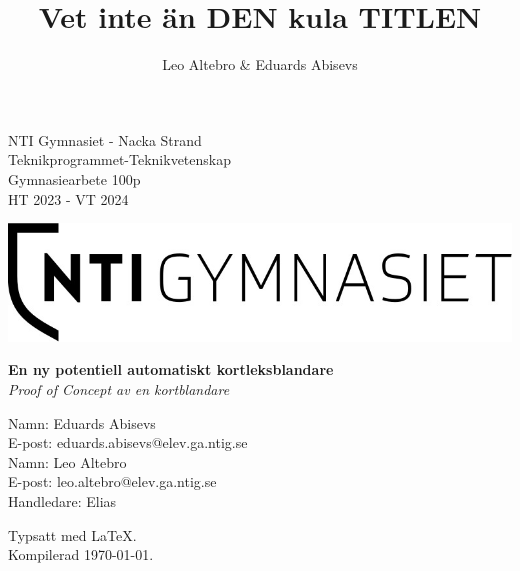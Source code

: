 \documentclass[swedish,a4paper]{article}
\title{Vet inte än DEN kula TITLEN}
\author{Leo Altebro & Eduards Abisevs}
\begin{document}
\begin{titlepage}
\begin{minipage}[t]{0.45\textwidth}
\raggedright
NTI Gymnasiet - Nacka Strand \\
Teknikprogrammet-Teknikvetenskap \\
Gymnasiearbete 100p \\
HT 2023 - VT 2024
\end{minipage}
\begin{minipage}[t]{0.5\textwidth}
\raggedleft
\begin{adjustbox}{valign=t}
\includegraphics[width=\linewidth]{images/logo.jpg}
\end{adjustbox}
\end{minipage}

\vspace*{\fill} %

\begin{center}
\Large\textbf{En ny potentiell automatiskt kortleksblandare}\\
\large\textit{Proof of Concept av en kortblandare}
\end{center}

\vspace*{\fill} %

\begin{minipage}[b]{0.45\textwidth}
\raggedright
Namn: Eduards Abisevs\\
E-post: eduards.abisevs@elev.ga.ntig.se\\
Namn: Leo Altebro\\
E-post: leo.altebro@elev.ga.ntig.se\\
Handledare: Elias
\end{minipage}
\begin{minipage}[b]{0.5\textwidth}
\raggedleft
Typsatt med \LaTeX. \\
Kompilerad \today.
\end{minipage}
\end{titlepage}

\end{document}
